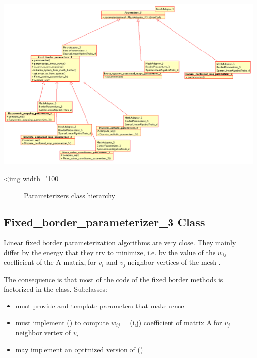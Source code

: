 \begin{center}
    \label{Surface_mesh_parameterization-fig-parameterizers_class_hierarchy}
    \begin{ccTexOnly}
        \includegraphics[width=1.1\textwidth]{Surface_mesh_parameterization/parameterizers_class_hierarchy}
    \end{ccTexOnly}
    \begin{ccHtmlOnly}
        <img width="100%
    \end{ccHtmlOnly}
    \begin{figure}[h]
        \caption{Parameterizers class hierarchy}
    \end{figure}
\end{center}


\subsection{Fixed\_border\_parameterizer\_3 Class}

Linear fixed border parameterization algorithms are very close. They mainly
differ by the energy that they try to minimize, i.e. by the value of the $w_{ij}$
coefficient of the A matrix, for $v_i$ and $v_j$ neighbor vertices of the mesh
\cite{cgal:fh-survey-05}.

The consequence is that most of the code of the fixed border methods is factorized in the
 class.
Subclasses:
\begin{itemize}
\item must provide  and 
      template parameters that make sense
\item must implement () to compute $w_{ij}$ = (i,j) coefficient
      of matrix A for $v_j$ neighbor vertex of $v_i$
\item may implement an optimized version of ()
\end{itemize}

